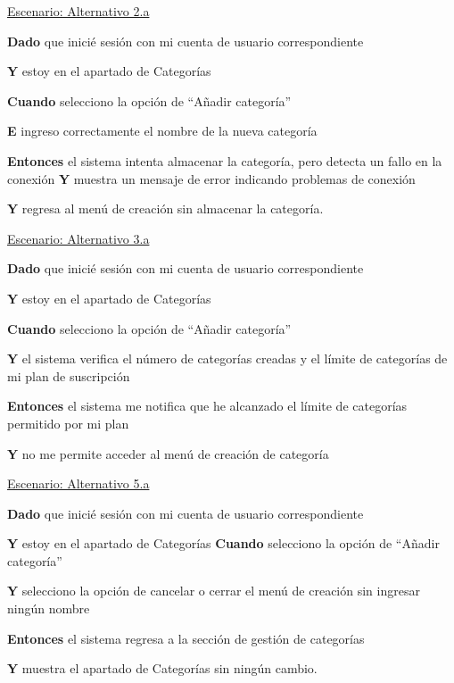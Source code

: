 \vspace{0.20cm}

\underline{Escenario: Alternativo 2.a}\par
\vspace{0.15cm}

\textbf{Dado} que inicié sesión con mi cuenta de usuario correspondiente\par
\textbf{Y} estoy en el apartado de Categorías\par
\textbf{Cuando} selecciono la opción de “Añadir categoría”\par
\textbf{E} ingreso correctamente el nombre de la nueva categoría\par
\textbf{Entonces} el sistema intenta almacenar la categoría, pero detecta un fallo en la conexión
\textbf{Y} muestra un mensaje de error indicando problemas de conexión\par
\textbf{Y} regresa al menú de creación sin almacenar la categoría.


\vspace{0.20cm}

\underline{Escenario: Alternativo 3.a}\par
\vspace{0.15cm}

\textbf{Dado} que inicié sesión con mi cuenta de usuario correspondiente\par
\textbf{Y} estoy en el apartado de Categorías\par
\textbf{Cuando} selecciono la opción de “Añadir categoría”\par
\textbf{Y} el sistema verifica el número de categorías creadas y el límite de categorías de mi plan de suscripción\par
\textbf{Entonces} el sistema me notifica que he alcanzado el límite de categorías permitido por mi plan\par
\textbf{Y} no me permite acceder al menú de creación de categoría\par
\vspace{0.20cm}

\underline{Escenario: Alternativo 5.a}\par
\vspace{0.15cm}

\textbf{Dado} que inicié sesión con mi cuenta de usuario correspondiente\par
\textbf{Y} estoy en el apartado de Categorías
\textbf{Cuando} selecciono la opción de “Añadir categoría”\par
\textbf{Y} selecciono la opción de cancelar o cerrar el menú de creación sin ingresar ningún nombre\par
\textbf{Entonces} el sistema regresa a la sección de gestión de categorías\par
\textbf{Y} muestra el apartado de Categorías sin ningún cambio.\par

